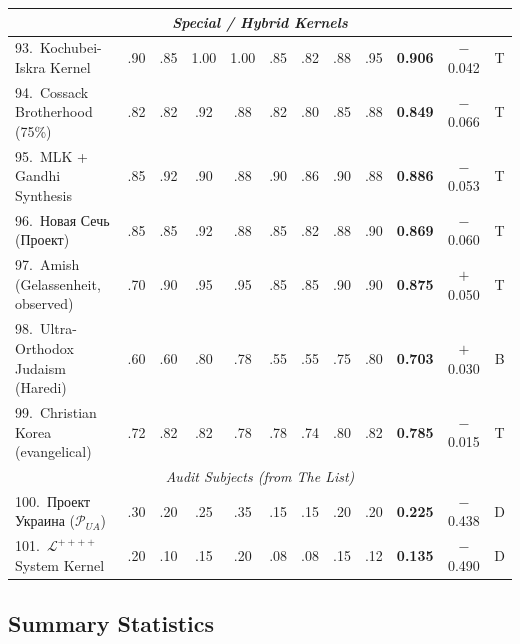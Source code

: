 \documentclass[11pt,a4paper]{article}
\theoremstyle{definition}
\theoremstyle{remark}
\newcommand{\LondonOp}{\mathcal{L}^{++++}}  %
\newcommand{\UkrProject}{\mathcal{P}_{UA}}  %
\begin{document}
\begin{longtable}{@{}l|cccccccc|cc|c@{}}
\midrule
\multicolumn{12}{c}{\textit{Special / Hybrid Kernels}} \\
\midrule
93.\ Kochubei-Iskra Kernel
  & .90 & .85 & 1.00 & 1.00 & .85 & .82 & .88 & .95
  & \textbf{0.906} & $-$0.042 & \textcolor{survival}{T} \\
94.\ Cossack Brotherhood (75\%)
  & .82 & .82 & .92 & .88 & .82 & .80 & .85 & .88
  & \textbf{0.849} & $-$0.066 & \textcolor{survival}{T} \\
95.\ MLK + Gandhi Synthesis
  & .85 & .92 & .90 & .88 & .90 & .86 & .90 & .88
  & \textbf{0.886} & $-$0.053 & \textcolor{survival}{T} \\
96.\ \foreignlanguage{russian}{Новая Сечь (Проект)}
  & .85 & .85 & .92 & .88 & .85 & .82 & .88 & .90
  & \textbf{0.869} & $-$0.060 & \textcolor{survival}{T} \\
97.\ Amish (Gelassenheit, observed)
  & .70 & .90 & .95 & .95 & .85 & .85 & .90 & .90
  & \textbf{0.875} & $+$0.050 & \textcolor{survival}{T} \\
98.\ Ultra-Orthodox Judaism (Haredi)
  & .60 & .60 & .80 & .78 & .55 & .55 & .75 & .80
  & \textbf{0.703} & $+$0.030 & \textcolor{borderline}{B} \\
99.\ Christian Korea (evangelical)
  & .72 & .82 & .82 & .78 & .78 & .74 & .80 & .82
  & \textbf{0.785} & $-$0.015 & \textcolor{survival}{T} \\
\midrule
\multicolumn{12}{c}{\textit{Audit Subjects (from The List)}} \\
\midrule
100.\ \foreignlanguage{russian}{Проект Украина ($\UkrProject$)}
  & .30 & .20 & .25 & .35 & .15 & .15 & .20 & .20
  & \textbf{0.225} & $-$0.438 & \textcolor{collapse}{D} \\
101.\ $\LondonOp$ System Kernel
  & .20 & .10 & .15 & .20 & .08 & .08 & .15 & .12
  & \textbf{0.135} & $-$0.490 & \textcolor{collapse}{D} \\

\end{longtable}

\subsection{Summary Statistics}
\label{sec:kernel-summary}
\end{document}
